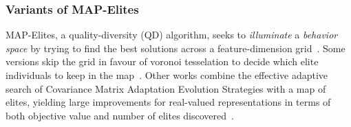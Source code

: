 
\subsubsection{Variants of MAP-Elites}
MAP-Elites, a quality-diversity (QD) algorithm, seeks to \emph{illuminate} a \emph{behavior space}
by trying to find the best solutions across a feature-dimension grid~\cite{p9Mouret2015}.
Some versions skip the grid in favour of voronoi tesselation to decide which elite individuals to keep in the map~\cite{p9cvt-mape2016}. Other works combine the effective adaptive search of Covariance Matrix Adaptation Evolution Strategies with a map of elites, yielding large improvements for real-valued representations in terms of both objective value and number of elites discovered~\cite{p9fontaine2019covariance}. 
